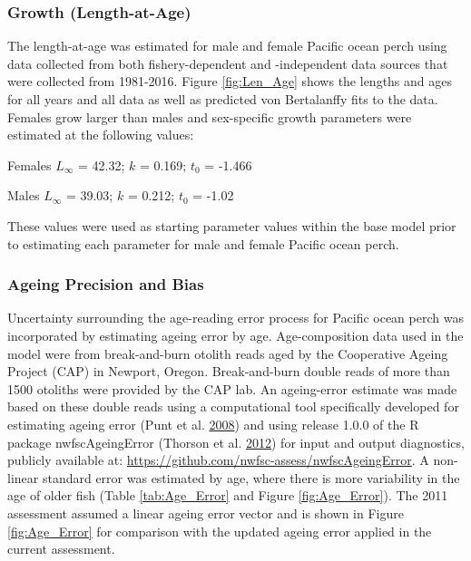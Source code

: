 \documentclass[12pt,]{article}
\begin{document}
\subsubsection{Growth (Length-at-Age)}\label{growth-length-at-age}

The length-at-age was estimated for male and female Pacific ocean perch
using data collected from both fishery-dependent and -independent data
sources that were collected from 1981-2016. Figure \ref{fig:Len_Age}
shows the lengths and ages for all years and all data as well as
predicted von Bertalanffy fits to the data. Females grow larger than
males and sex-specific growth parameters were estimated at the following
values:

\begin{centering}

Females $L_{\infty}$ = 42.32; $k$ = 0.169; $t_0$ = -1.466

Males $L_{\infty}$ = 39.03; $k$ = 0.212; $t_0$ = -1.02

\end{centering}

These values were used as starting parameter values within the base
model prior to estimating each parameter for male and female Pacific
ocean perch.

\subsubsection{Ageing Precision and
Bias}\label{ageing-precision-and-bias}

Uncertainty surrounding the age-reading error process for Pacific ocean
perch was incorporated by estimating ageing error by age.
Age-composition data used in the model were from break-and-burn otolith
reads aged by the Cooperative Ageing Project (CAP) in Newport, Oregon.
Break-and-burn double reads of more than 1500 otoliths were provided by
the CAP lab. An ageing-error estimate was made based on these double
reads using a computational tool specifically developed for estimating
ageing error (Punt et al.
\protect\hyperlink{ref-punt_quantifying_2008}{2008}) and using release
1.0.0 of the R package nwfscAgeingError (Thorson et al.
\protect\hyperlink{ref-thorson_nwfscageingerror:_2012}{2012}) for input
and output diagnostics, publicly available at:
\url{https://github.com/nwfsc-assess/nwfscAgeingError}. A non-linear
standard error was estimated by age, where there is more variability in
the age of older fish (Table \ref{tab:Age_Error} and Figure
\ref{fig:Age_Error}). The 2011 assessment assumed a linear ageing error
vector and is shown in Figure \ref{fig:Age_Error} for comparison with
the updated ageing error applied in the current assessment.
\end{document}
